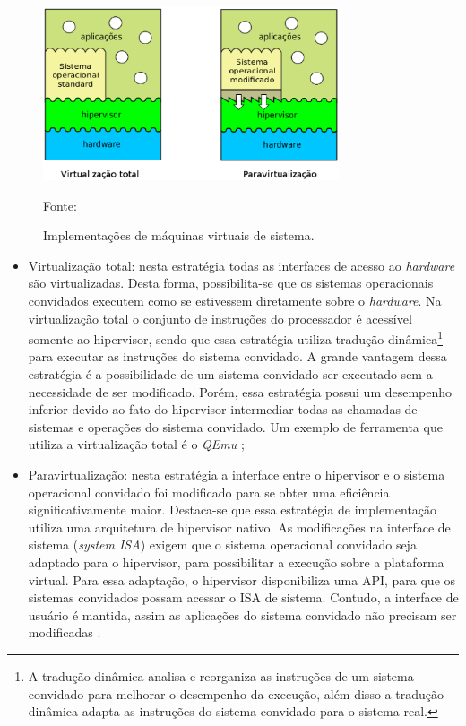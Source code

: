 \begin{figure}[h!]
 \centering
 \includegraphics[width=330px]{img/vms_implementacao.eps}
 \caption{Implementações de máquinas virtuais de sistema.}
 \label{fig:vms_implementacao}
 Fonte: \citet{maziero2013}
\end{figure}

\begin{itemize}
 \item Virtualização total: nesta estratégia todas as interfaces de acesso ao \textit{hardware} são virtualizadas. Desta forma, possibilita-se 
 que os sistemas operacionais convidados executem como se estivessem diretamente sobre o \textit{hardware}. Na virtualização total o conjunto de 
 instruções do processador é acessível somente ao hipervisor, sendo que essa estratégia utiliza tradução dinâmica\footnote[1]{A tradução dinâmica 
 analisa e reorganiza as instruções de um sistema convidado para melhorar o desempenho da execução, além disso a tradução dinâmica adapta as 
 instruções do sistema convidado para o sistema real.} para executar as instruções do sistema convidado. A grande vantagem dessa estratégia é a 
 possibilidade de um sistema convidado ser executado sem a necessidade de ser modificado. Porém, essa estratégia possui um desempenho inferior 
 devido ao fato do hipervisor intermediar todas as chamadas de sistemas e operações do sistema convidado. Um exemplo de ferramenta que utiliza 
 a virtualização total é o \textit{QEmu} \cite{qemu};
 \item Paravirtualização: nesta estratégia a interface entre o hipervisor e o sistema operacional convidado foi modificado para se obter uma 
 eficiência significativamente maior. Destaca-se que essa estratégia de implementação utiliza uma arquitetura de hipervisor nativo. 
 As modificações na interface de sistema (\textit{system \ac{ISA}}) exigem que o sistema operacional convidado seja adaptado para o hipervisor, 
 para possibilitar a execução sobre a plataforma virtual. Para essa adaptação, o hipervisor disponibiliza uma \ac{API}, para que os 
 sistemas convidados possam acessar o \ac{ISA} de sistema. Contudo, a interface de usuário é mantida, assim as aplicações do sistema convidado 
 não precisam ser modificadas \cite{maziero2013}.
\end{itemize}

